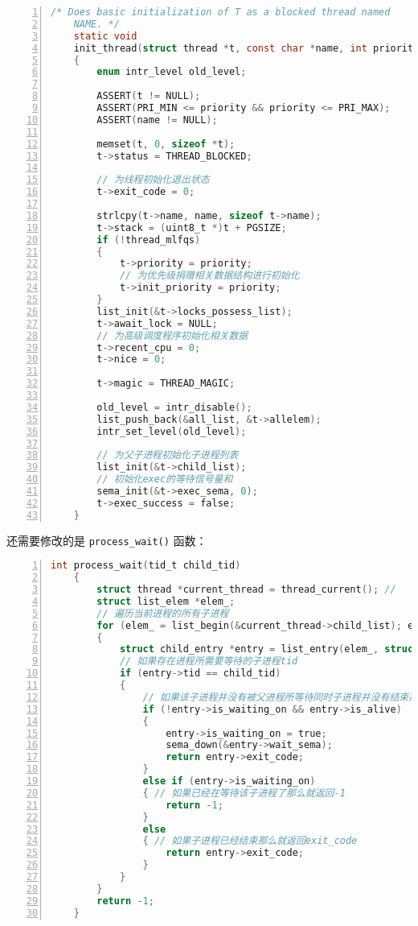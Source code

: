 \documentclass{article}
\begin{document}
	\begin{lstlisting}[xleftmargin = 4em,xrightmargin = 4em, aboveskip = 1em, numbers = left, language = C,title=src/threads/thread.c - init\_thread()]
    /* Does basic initialization of T as a blocked thread named
    NAME. */
    static void
    init_thread(struct thread *t, const char *name, int priority)
    {
    	enum intr_level old_level;
    	
    	ASSERT(t != NULL);
    	ASSERT(PRI_MIN <= priority && priority <= PRI_MAX);
    	ASSERT(name != NULL);
    	
    	memset(t, 0, sizeof *t);
    	t->status = THREAD_BLOCKED;
    	
    	// 为线程初始化退出状态
    	t->exit_code = 0;
    	
    	strlcpy(t->name, name, sizeof t->name);
    	t->stack = (uint8_t *)t + PGSIZE;
    	if (!thread_mlfqs)
    	{
    		t->priority = priority;
    		// 为优先级捐赠相关数据结构进行初始化
    		t->init_priority = priority;
    	}
    	list_init(&t->locks_possess_list);
    	t->await_lock = NULL;
    	// 为高级调度程序初始化相关数据
    	t->recent_cpu = 0;
    	t->nice = 0;
    	
    	t->magic = THREAD_MAGIC;
    	
    	old_level = intr_disable();
    	list_push_back(&all_list, &t->allelem);
    	intr_set_level(old_level);
    	
    	// 为父子进程初始化子进程列表
    	list_init(&t->child_list);
    	// 初始化exec的等待信号量和
    	sema_init(&t->exec_sema, 0);
    	t->exec_success = false;
    }
	\end{lstlisting}
	
	还需要修改的是 \texttt{process\_wait()} 函数：
	
	\begin{lstlisting}[xleftmargin = 4em,xrightmargin = 4em, aboveskip = 1em, numbers = left, language = C,title=src/userprog/process.c - process\_wait]
    int process_wait(tid_t child_tid)
    {
        struct thread *current_thread = thread_current(); //
        struct list_elem *elem_;
        // 遍历当前进程的所有子进程
        for (elem_ = list_begin(&current_thread->child_list); elem_ != list_end(&current_thread->child_list); elem_ = list_next(elem_))
        {
            struct child_entry *entry = list_entry(elem_, struct child_entry, elem);
            // 如果存在进程所需要等待的子进程tid
            if (entry->tid == child_tid)
            {
            	// 如果该子进程并没有被父进程所等待同时子进程并没有结束那么就使用信号量卡住自身来等待子进程运行结束
            	if (!entry->is_waiting_on && entry->is_alive)
            	{
                    entry->is_waiting_on = true;
                    sema_down(&entry->wait_sema);
                    return entry->exit_code;
            	}
            	else if (entry->is_waiting_on)
            	{ // 如果已经在等待该子进程了那么就返回-1
            	    return -1;
            	}
            	else
            	{ // 如果子进程已经结束那么就返回exit_code
            	    return entry->exit_code;
            	}
            }
        }
        return -1;
    }
	\end{lstlisting}
	
\end{document}
